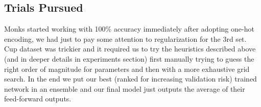 \subsection{Trials Pursued}

Monks started working with 100\% accuracy immediately after adopting one-hot encoding, we had just to pay some attention to regularization for the 3rd set.
Cup dataset was trickier and it required us to try the heuristics described above (and in deeper details in experiments section) first manually trying to guess the right order of magnitude for parameters and then with a more exhaustive grid search. In the end we put our best (ranked for increasing validation risk) trained network in an ensemble and our final model just outputs the average of their feed-forward outputs. 

